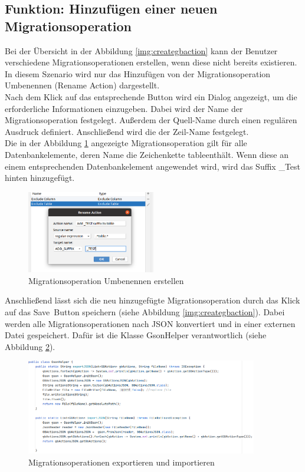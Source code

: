 \subsection{Funktion: Hinzufügen einer neuen Migrationsoperation}
	
	Bei der Übersicht in der Abbildung \ref{img:creategbaction} kann der Benutzer verschiedene Migrationsoperationen erstellen, wenn diese nicht bereits existieren. In diesem Szenario wird nur das Hinzufügen von der Migrationsoperation Umbenennen (Rename Action) dargestellt.\\
	Nach dem Klick auf das entsprechende Button wird ein Dialog angezeigt, um die erforderliche Informationen einzugeben. Dabei wird der Name der Migrationsoperation festgelegt. Außerdem der Quell-Name durch einen regulären Ausdruck definiert. Anschließend  wird die der Zeil-Name festgelegt. \\
	Die in der Abbildung \ref{img:createRename} angezeigte Migrationsoperation gilt für alle Datenbankelemente, deren Name die Zeichenkette \glqq table\grqq enthält. Wenn diese an einem entsprechenden Datenbankelement angewendet wird, wird das Suffix \glqq \_Test\grqq \, hinten hinzugefügt.
	\begin{figure}[h]
		\centering
		\includegraphics[width=0.5\textwidth]{images/ui/createRename}
		\caption{Migrationsoperation Umbenennen erstellen}
		\label{img:createRename}
	\end{figure}
	Anschließend lässt sich die neu hinzugefügte Migrationsoperation durch das Klick auf das \glqq Save\grqq \, Button speichern (siehe Abbildung \ref{img:creategbaction}). Dabei werden alle Migrationsoperationen nach JSON konvertiert und in einer externen Datei gespeichert. Dafür ist die Klasse GsonHelper verantwortlich (siehe Abbildung \ref{img:gson}).
	\begin{figure}[h]
		\centering
		\includegraphics[width=0.9\textwidth]{images/ui/gson}
		\caption{Migrationsoperationen exportieren und importieren}
		\label{img:gson}
	\end{figure}
	
